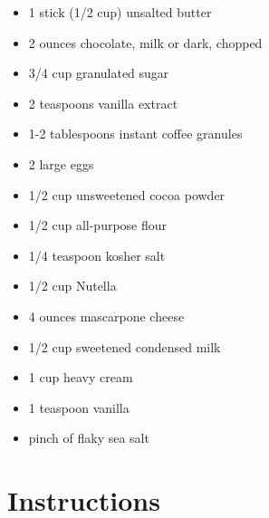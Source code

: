 \documentclass[
  letterpaper,
  DIV=11,
  numbers=noendperiod,
  titlepage=false]{scrreprt}
\providecommand{\tightlist}{%
  \setlength{\itemsep}{0pt}\setlength{\parskip}{0pt}}\usepackage{longtable,booktabs,array}
\begin{document}
\begin{itemize}
\tightlist
\item
  1 stick (1/2 cup) unsalted butter
\item
  2 ounces chocolate, milk or dark, chopped
\item
  3/4 cup granulated sugar
\item
  2 teaspoons vanilla extract
\item
  1-2 tablespoons instant coffee granules
\item
  2 large eggs
\item
  1/2 cup unsweetened cocoa powder
\item
  1/2 cup all-purpose flour
\item
  1/4 teaspoon kosher salt
\item
  1/2 cup Nutella
\item
  4 ounces mascarpone cheese
\item
  1/2 cup sweetened condensed milk
\item
  1 cup heavy cream
\item
  1 teaspoon vanilla
\item
  pinch of flaky sea salt
\end{itemize}

\section{Instructions}\label{instructions-96}
\end{document}

